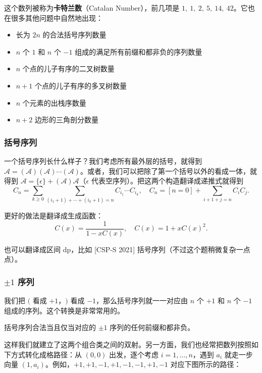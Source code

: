     这个数列被称为\textbf{卡特兰数}（Catalan Number），前几项是 $1,\ 1,\ 2,\ 5,\ 14,\ 42$。它也在很多其他问题中自然地出现：

    \begin{itemize}
        \item 长为 $2n$ 的合法括号序列数量
        \item $n$ 个 $1$ 和 $n$ 个 $-1$ 组成的满足所有前缀和都非负的序列数量
        \item $n$ 个点的儿子有序的二叉树数量
        \item $n+1$ 个点的儿子有序的多叉树数量
        \item $n$ 个元素的出栈序数量
        \item $n+2$ 边形的三角剖分数量
    \end{itemize}

\subsubsection{括号序列}
    一个括号序列长什么样子？我们考虑所有最外层的括号，就得到 $\mathcal A=(\mathcal A)(\mathcal A)\cdots (\mathcal A)$。或者，我们可以把除了第一个括号以外的看成一体，就得到 $\mathcal A=\{\epsilon\}+(\mathcal A)\mathcal A$（$\epsilon$ 代表空序列）。把这两个构造翻译成递推式就得到
    $$
    C_n=\sum_{k\ge 0}\sum_{(i_1+1)+\cdots+(i_k+1)=n}C_{i_1}\cdots C_{i_k},\quad C_n=[n=0]+\sum_{i+1+j=n}C_{i}C_j.
    $$

    更好的做法是翻译成生成函数：
    $$
    C(x)=\frac{1}{1-xC(x)},\quad C(x)=1+xC(x)^2.
    $$

    也可以翻译成区间 dp，比如 [CSP-S 2021] 括号序列（不过这个题稍微复杂一点点）。
\subsubsection{$\pm 1$ 序列}
    我们把 $($ 看成 $+1$，$)$ 看成 $-1$，那么括号序列就一一对应由 $n$ 个 $+1$ 和 $n$ 个 $-1$ 组成的序列。这个转换是非常常用的。
    \begin{theorem}
        括号序列合法当且仅当对应的 $\pm 1$ 序列的任何前缀和都非负。
    \end{theorem}
    这样我们就建立了这两个组合类之间的双射。另一方面，我们也经常把数列按照如下方式转化成格路径：从 $(0,0)$ 出发，逐个考虑 $i=1,\ldots,n$，遇到 $a_i$ 就走一步向量 $(1,a_i)$。例如，$+1,+1,-1,+1,-1,-1,+1,-1$ 对应下图所示的路径：

